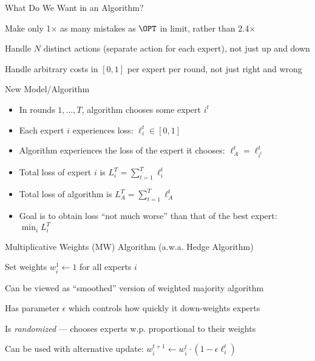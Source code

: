 \documentclass[11pt,aspectratio=169,handout]{beamer}
\begin{document}
  
  \begin{frame}{What Do We Want in an Algorithm?}
   \begin{itemizes}[1.5em]
    \item Make only 1$\times$ as many mistakes as $\OPT$ in limit, rather than 2.4$\times$
    \item Handle $N$ distinct actions (separate action for each expert), not just up and down
    \item Handle arbitrary costs in $[0,1]$ per expert per round, not just right and wrong
   \end{itemizes}
  \end{frame}
  
  
  \begin{frame}{New Model/Algorithm}
   \begin{itemize}[<+->]
   \setlength{\itemsep}{1em}
    \item In rounds $1,\ldots, T$, algorithm \alert{chooses some expert} $i^t$
    \item Each expert $i$ \alert{experiences loss}: $\ell_i^t \in [0,1]$
    \item Algorithm experiences the loss of the expert it chooses: $\ell_A^t = \ell_{i^t}^t$
    \item Total loss of expert $i$ is $L_i^T = \sum_{t=1}^T \ell_i^t$
    \item Total loss of algorithm is $L_A^T = \sum_{t=1}^T \ell_A^t$
    \item Goal is to obtain loss \alert{``not much worse''} than that of the best expert: $\min_i L_i^T$
   \end{itemize}
  \end{frame}
  
  
  \begin{frame}{Multiplicative Weights (MW) Algorithm (a.w.a. Hedge Algorithm)}
   \begin{algorithm*}[H]
    Set weights $w_i^1 \leftarrow 1$ for all experts $i$\;
   \end{algorithm*}
   
   \vspace{1em}
   
   \begin{itemizes}[0.7em]\small
    \item<2-> Can be viewed as ``smoothed'' version of weighted majority algorithm
    \item<3-> Has parameter $\epsilon$ which controls how quickly it down-weights experts
    \item<4-> Is \emph{randomized} --- chooses experts w.p. proportional to their weights
    \item<5-> Can be used with alternative update: $w_i^{t+1} \leftarrow w_i^t \cdot(1-\epsilon \ell_i^t)$
   \end{itemizes}
  \end{frame}
  
\end{document}
